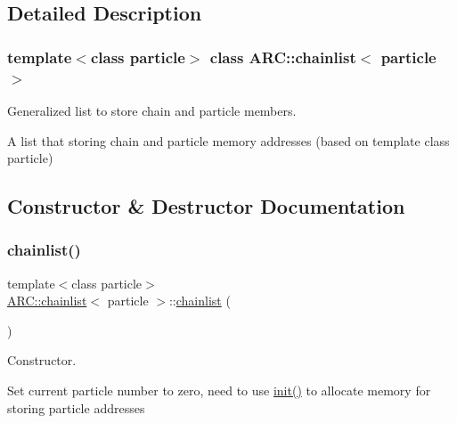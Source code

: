 \subsection{Detailed Description}
\subsubsection*{template$<$class particle$>$\newline
class A\+R\+C\+::chainlist$<$ particle $>$}

Generalized list to store chain and particle members. 

A list that storing chain and particle memory addresses (based on template class particle) 

\subsection{Constructor \& Destructor Documentation}
\hypertarget{classARC_1_1chainlist_ab4e3b53aee12e8970d94e1b368088bfa}{}\label{classARC_1_1chainlist_ab4e3b53aee12e8970d94e1b368088bfa} 
\subsubsection{\texorpdfstring{chainlist()}{chainlist()}\hspace{0.1cm}{\footnotesize\ttfamily [1/2]}}
{\footnotesize\ttfamily template$<$class particle$>$ \\
\hyperlink{classARC_1_1chainlist}{A\+R\+C\+::chainlist}$<$ particle $>$\+::\hyperlink{classARC_1_1chainlist}{chainlist} (\begin{DoxyParamCaption}{ }\end{DoxyParamCaption})\hspace{0.3cm}{\ttfamily [inline]}}



Constructor. 

Set current particle number to zero, need to use \hyperlink{classARC_1_1chainlist_a84a2c65edf27bd25254e188ebf7d5dce}{init()} to allocate memory for storing particle addresses \hypertarget{classARC_1_1chainlist_a80fdd1846ac0d15cee0726a0f9548371}{}\label{classARC_1_1chainlist_a80fdd1846ac0d15cee0726a0f9548371} 
